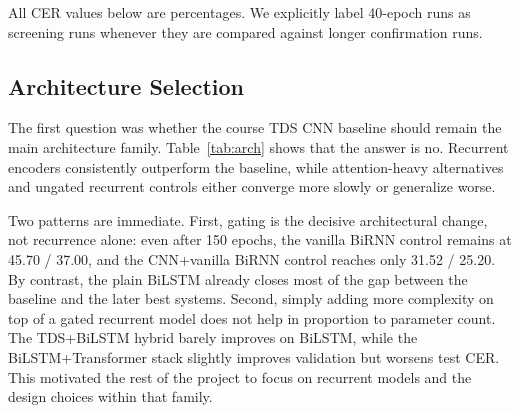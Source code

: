 All CER values below are percentages. We explicitly label 40-epoch runs as screening runs whenever they are compared against longer confirmation runs.

\subsection{Architecture Selection}

The first question was whether the course TDS CNN baseline should remain the main architecture family. Table~\ref{tab:arch} shows that the answer is no. Recurrent encoders consistently outperform the baseline, while attention-heavy alternatives and ungated recurrent controls either converge more slowly or generalize worse.

\begin{table}[!htbp]
\centering
\footnotesize
\setlength{\tabcolsep}{3pt}
\caption{Representative architecture comparison.}
\label{tab:arch}
\end{table}

Two patterns are immediate. First, gating is the decisive architectural change, not recurrence alone: even after 150 epochs, the vanilla BiRNN control remains at 45.70 / 37.00, and the CNN+vanilla BiRNN control reaches only 31.52 / 25.20. By contrast, the plain BiLSTM already closes most of the gap between the baseline and the later best systems. Second, simply adding more complexity on top of a gated recurrent model does not help in proportion to parameter count. The TDS+BiLSTM hybrid barely improves on BiLSTM, while the BiLSTM+Transformer stack slightly improves validation but worsens test CER. This motivated the rest of the project to focus on recurrent models and the design choices within that family.

